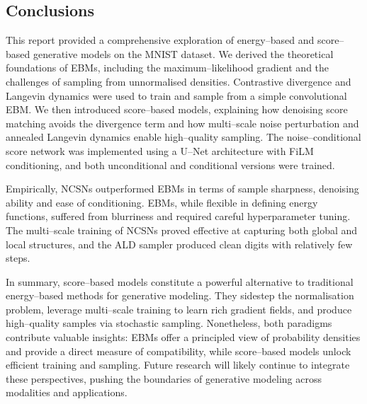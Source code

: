 \subsection{Conclusions}

This report provided a comprehensive exploration of energy–based and
score–based generative models on the MNIST dataset.  We derived the
theoretical foundations of EBMs, including the maximum–likelihood
gradient and the challenges of sampling from unnormalised densities.
Contrastive divergence and Langevin dynamics were used to train and
sample from a simple convolutional EBM.  We then introduced score–based
models, explaining how denoising score matching avoids the divergence
term and how multi–scale noise perturbation and annealed Langevin
dynamics enable high–quality sampling.  The noise–conditional score
network was implemented using a U–Net architecture with FiLM
conditioning, and both unconditional and conditional versions were
trained.

Empirically, NCSNs outperformed EBMs in terms of sample sharpness,
denoising ability and ease of conditioning.  EBMs, while flexible in
defining energy functions, suffered from blurriness and required careful
hyperparameter tuning.  The multi–scale training of NCSNs proved
effective at capturing both global and local structures, and the ALD
sampler produced clean digits with relatively few steps.

In summary, score–based models constitute a powerful alternative to
traditional energy–based methods for generative modeling.  They
sidestep the normalisation problem, leverage multi–scale training to
learn rich gradient fields, and produce high–quality samples via
stochastic sampling.  Nonetheless, both paradigms contribute valuable
insights: EBMs offer a principled view of probability densities and
provide a direct measure of compatibility, while score–based models
unlock efficient training and sampling.  Future research will likely
continue to integrate these perspectives, pushing the boundaries of
generative modeling across modalities and applications.
